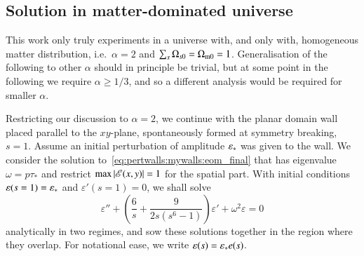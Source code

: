 


\subsection{Solution in matter-dominated universe}
    This work only truly experiments in a universe with, and only with, homogeneous matter distribution, i.e.~$\alpha=2$ and $\sum_{s}\Omega_{s0}=\Omega_\mathrm{m0}=1$. Generalisation of the following to other $\alpha$ should in principle be trivial, but at some point in the following we require $\alpha\geq 1/3$, and so a different analysis would be required for smaller $\alpha$.

    Restricting our discussion to $\alpha=2$, we continue with the planar domain wall placed parallel to the $xy$-plane, spontaneously formed at symmetry breaking, $s=1$. Assume an initial perturbation of amplitude $\varepsilon_\ast$ was given to the wall. We consider the solution to~\cref{eq:pertwalls:mywalls:eom_final} that has eigenvalue $\omega=p\tau_\ast$ and restrict $\max{\abs{\mathscr{E}(x,y)}}=1$ for the spatial part.
    With initial conditions $\varepsilon(s=1)=\varepsilon_\ast$ and $\varepsilon'(s=1)=0$, we shall solve
    \begin{equation}\label{eq:pertwalls:mywalls:eom_eps_s_MD}
        \varepsilon'' + \left( \frac{6}{s}  +\frac{9}{2s\left(s^6-1\right)} \right) \varepsilon' + \omega^2 \varepsilon = 0
    \end{equation}
    analytically in two regimes, and sow these solutions together in the region where they overlap. For notational ease, we write $\varepsilon(s) = \varepsilon_\ast e(s)$.
    

